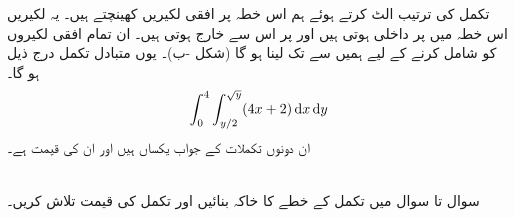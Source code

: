 تکمل کی ترتیب الٹ کرتے ہوئے ہم اس خطہ  پر افقی لکیریں کھینچتے ہیں۔ یہ لکیریں اس خطہ میں  پر داخلی ہوتی ہیں اور  پر اس سے خارج ہوتی ہیں۔ ان تمام افقی لکیروں کو شامل کرنے کے لیے ہمیں  سے  تک لینا ہو گا (شکل -ب)۔ یوں  متبادل تکمل درج ذیل ہو گا۔
\begin{align*}
\int_0^4\int_{y/2}^{\sqrt{y}}(4x+2)\dif x\dif y
\end{align*}
ان دونوں تکملات کے جواب یکساں ہیں  اور ان کی قیمت   ہے۔


\\
سوال  تا سوال  میں تکمل کے  خطے کا خاکہ بنائیں اور تکمل کی قیمت تلاش کریں۔ 

